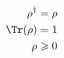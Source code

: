 \begin{equation}\label{eqn:rho_prop}
\begin{split}
    \rho^\dag &= \rho \\
    \Tr(\rho) & = 1 \\
    \rho & \geqslant 0
\end{split}
\end{equation}

